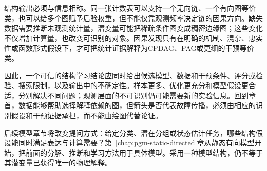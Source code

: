 结构输出必须与信息相称。同一张计数表可以支持一个无向链、一个有向图等价类，也可以给多个图赋予后验权重，但不能仅凭观测频率决定链的因果方向。缺失数据需要推断未观测统计量，潜变量可能把稀疏条件图变成稠密边缘图；这些变化不仅增加计算量，也改变可识别的对象。因果发现只有在明确的机制、混杂、忠实性或函数形式假设下，才可把统计证据解释为CPDAG、PAG或更细的干预等价类。

因此，一个可信的结构学习结论应同时给出候选模型、数据和干预条件、评分或检验、搜索限制，以及输出中的不确定性。样本更多、优化更充分和模型假设更合适，分别解决不同问题；观测层面的不可识别仍可能需要新的实验信息。回到章首，数据能够帮助选择解释依赖的图，但箭头是否代表故障传播，必须由相应的识别假设和干预证据承担，而不能由绘图代替论证。

后续模型章节将改变提问方式：给定分类、潜在分组或状态估计任务，哪些结构假设能同时满足表达与计算需要？第~\ref{chap:pgm-static-directed}章从静态有向模型开始，把前面的分解、推断和学习方法用于具体模型。采用一种模型结构，仍不等于其潜变量已获得唯一的物理解释。
